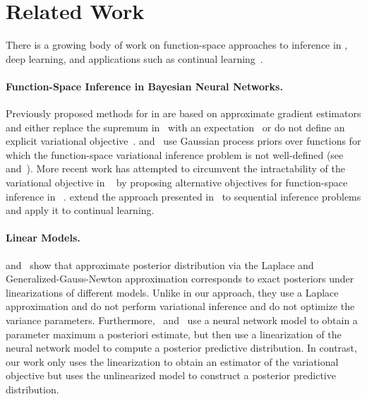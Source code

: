 %

\section{Related Work}
\label{sec:related_work}

There is a growing body of work on function-space approaches to inference in \bnns, deep learning, and applications such as continual learning~\citep{benjamin2018measuring,sun2019fbnn,titsias2020functional,burt2021understanding,pingbo2020continual,ma2021functional,Rudner2022sfsvi}.

\paragraph{Function-Space Inference in Bayesian Neural Networks.}
Previously proposed methods for \fsvi in \bnns are based on approximate gradient estimators and either replace the supremum in~ with an expectation~\citep{sun2019fbnn} or do not define an explicit variational objective~\citep{wang2018function}.
\citet{sun2019fbnn} and~\citet{Carvalho_2020_CVPR} use Gaussian process priors over functions for which the function-space variational inference problem is not well-defined (see~ and~\citet{burt2021understanding}).
More recent work has attempted to circumvent the intractability of the variational objective in ~ by proposing alternative objectives for function-space inference in \bnns~\citep{ma2019variational,ober2020global,ma2021functional}.
\citet{Rudner2022sfsvi} extend the approach presented in~ to sequential inference problems and apply it to continual learning.

\paragraph{Linear Models.}
\citet{immer2020improving} and~\citet{khan2019ddn2gp} show that approximate \bnn posterior distribution via the Laplace and Generalized-Gauss-Newton approximation corresponds to exact posteriors under linearizations of different models.
Unlike in our approach, they use a Laplace approximation and do not perform variational inference and do not optimize the variance parameters.
Furthermore,~\citet{immer2020improving} and~\citet{khan2019ddn2gp} use a neural network model to obtain a parameter maximum a posteriori estimate, but then use a linearization of the neural network model to compute a posterior predictive distribution.
In contrast, our work only uses the linearization to obtain an estimator of the variational objective but uses the unlinearized model to construct a posterior predictive distribution.

